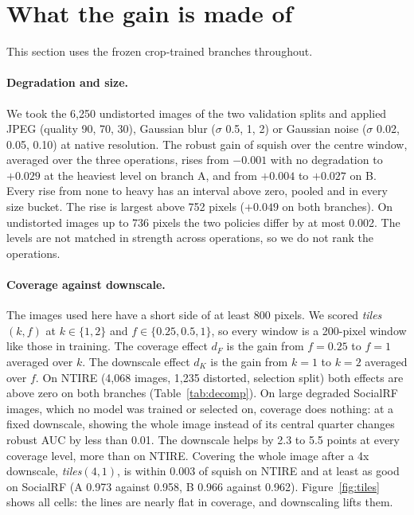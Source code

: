 \documentclass[letterpaper]{article} %
\begin{document}
\section{What the gain is made of}
\label{sec:decomp}

This section uses the frozen crop-trained branches throughout.

\paragraph{Degradation and size.} We took the 6,250 undistorted images of the
two validation splits and applied JPEG (quality 90, 70, 30), Gaussian blur
($\sigma$ 0.5, 1, 2) or Gaussian noise ($\sigma$ 0.02, 0.05, 0.10) at native
resolution. The robust gain of squish over the centre window, averaged over
the three operations, rises from $-0.001$ with no degradation to $+0.029$ at
the heaviest level on branch A, and from $+0.004$ to $+0.027$ on B. Every
rise from none to heavy has an interval above zero, pooled and in every size
bucket. The rise is largest above 752 pixels ($+0.049$ on both branches). On
undistorted images up to 736 pixels the two policies differ by at most
0.002. The levels are not matched in strength across operations, so we do
not rank the operations.

\paragraph{Coverage against downscale.} The images used here have a short
side of at least 800 pixels. We scored \emph{tiles}$(k, f)$ at
$k \in \{1, 2\}$ and $f \in \{0.25, 0.5, 1\}$, so every window is a
200-pixel window like those in training. The coverage effect $d_F$ is the
gain from $f = 0.25$ to $f = 1$ averaged over $k$. The downscale effect $d_K$
is the gain from $k = 1$ to $k = 2$ averaged over $f$. On NTIRE (4,068 images,
1,235 distorted, selection split) both effects are above zero on both branches
(Table~\ref{tab:decomp}). On large degraded SocialRF images, which no model
was trained or selected on, coverage does nothing: at a fixed downscale,
showing the whole image instead of its central quarter changes robust AUC by
less than 0.01. The downscale helps by 2.3 to 5.5 points at every coverage
level, more than on NTIRE. Covering the whole image after a 4x downscale,
\emph{tiles}$(4, 1)$, is within 0.003 of squish on NTIRE and at least as good
on SocialRF (A 0.973 against 0.958, B 0.966 against 0.962). Figure~\ref{fig:tiles} shows all cells: the lines are nearly flat in
coverage, and downscaling lifts them.
\end{document}
